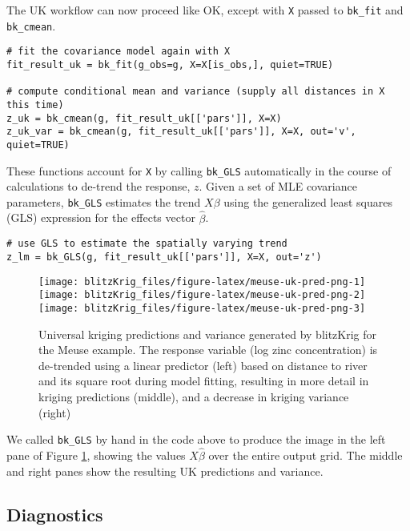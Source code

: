 The UK workflow can now proceed like OK, except with \texttt{X} passed to \texttt{bk\_fit} and \texttt{bk\_cmean}.

\begin{verbatim}
# fit the covariance model again with X
fit_result_uk = bk_fit(g_obs=g, X=X[is_obs,], quiet=TRUE)

# compute conditional mean and variance (supply all distances in X this time)
z_uk = bk_cmean(g, fit_result_uk[['pars']], X=X)
z_uk_var = bk_cmean(g, fit_result_uk[['pars']], X=X, out='v', quiet=TRUE)
\end{verbatim}

These functions account for \texttt{X} by calling \texttt{bk\_GLS} automatically in the course of calculations to de-trend the response, \(z\). Given a set of MLE covariance parameters, \texttt{bk\_GLS} estimates the trend \(X\beta\) using the generalized least squares (GLS) expression for the effects vector \(\hat{\beta}\).

\begin{verbatim}
# use GLS to estimate the spatially varying trend 
z_lm = bk_GLS(g, fit_result_uk[['pars']], X=X, out='z')
\end{verbatim}

\begin{figure}
\texttt{[image: blitzKrig\_files/figure-latex/meuse-uk-pred-png-1]} \texttt{[image: blitzKrig\_files/figure-latex/meuse-uk-pred-png-2]} \texttt{[image: blitzKrig\_files/figure-latex/meuse-uk-pred-png-3]} \caption{Universal kriging predictions and variance generated by blitzKrig for the Meuse example. The response variable (log zinc concentration) is de-trended using a linear predictor (left) based on distance to river and its square root during model fitting, resulting in more detail in kriging predictions (middle), and a decrease in kriging variance (right)}\label{fig:meuse-uk-pred-png}
\end{figure}

We called \texttt{bk\_GLS} by hand in the code above to produce the image in the left pane of Figure \ref{fig:meuse-uk-pred-png}, showing the values \(X\hat{\beta}\) over the entire output grid. The middle and right panes show the resulting UK predictions and variance.

\hypertarget{diagnostics}{%
\subsection{Diagnostics}\label{diagnostics}}

